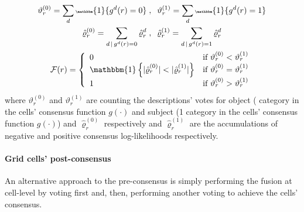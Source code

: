 \documentclass[10pt,twocolumn,letterpaper]{article}
\begin{document}
\begin{gather*}\tiny
\vartheta_r^{(0)} = \sum_{d} \mathbbm{1}\{ g^{d}(r) = 0 \} \; , \;\; \vartheta_r^{(1)} = \sum_{d} \mathbbm{1}\{ g^{d}(r) = 1 \} \\
\hat{\varrho}_r^{(0)} = \sum_{d \,|\, g^{d}(r) = 0} \hat{\varrho}_r^d \; , \;\; \hat{\varrho}_r^{(1)}  =\sum_{d \,|\, g^{d}(r) = 1} \hat{\varrho}_r^d \\
\mathcal{F}(r) =
\left\{
	\begin{array}{ll}
		0  &  \mbox{if } \vartheta_r^{(0)} < \vartheta_r^{(1)}   \\
		\mathbbm{1}\left\{ | \hat{\varrho}_r^{(0)} | < | \hat{\varrho}_r^{(1)} | \right\} &  \mbox{if } \vartheta_r^{(0)} = \vartheta_r^{(1)}   \\
		1 &  \mbox{if } \vartheta_r^{(0)} > \vartheta_r^{(1)}   \\
	\end{array}
\right.
\end{gather*}
where $\vartheta_r^{(0)}$ and $\vartheta_r^{(1)}$ are counting the descriptions' votes for object ( category in the cells' consensus function $g(\cdot)$ and subject (1 category in the cells' consensus function $g(\cdot)$) and $\hat{\varrho}_r^{(0)}$ respectively and $\hat{\varrho}_r^{(1)}$ are the accumulations of negative and positive consensus log-likelihoods respectively.

\paragraph{Grid cells' post-consensus}

An alternative approach to the pre-consensus is simply performing the fusion at cell-level by voting first and, then, performing another voting to achieve the cells' consensus.
\end{document}

